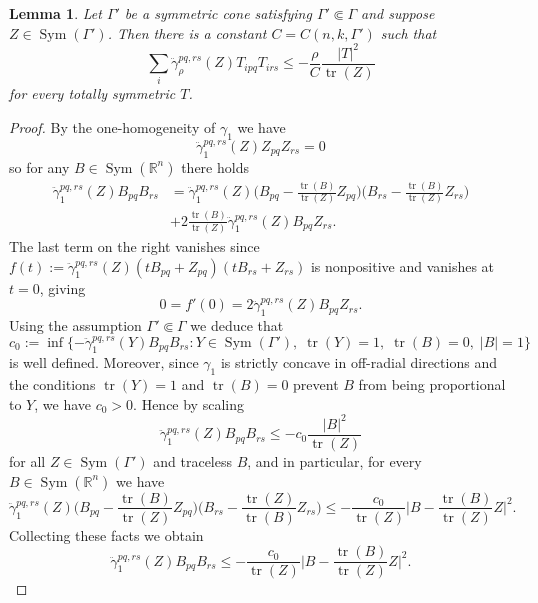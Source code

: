 \documentclass[12pt]{amsart}
\newtheorem{lemma}[theorem]{Lemma}
\DeclareMathOperator{\tr}{tr}
\DeclareMathOperator{\sym}{Sym}
\begin{document}
\begin{lemma}
\label{lem:good_grad}
Let $\Gamma'$ be a symmetric cone satisfying $\Gamma' \Subset \Gamma$ and suppose $Z \in \sym(\Gamma')$. Then there is a constant $C = C(n,k,\Gamma')$ such that 
\[\sum_i \ddot \gamma_\rho^{pq,rs}(Z) T_{ipq} T_{irs} \leq - \frac{\rho}{C} \frac{|T|^2}{\tr(Z)}\]
for every totally symmetric $T$.
\end{lemma}

\begin{proof}
By the one-homogeneity of $\gamma_1$ we have 
\[\ddot \gamma_1^{pq,rs}(Z) Z_{pq} Z_{rs} = 0\]
so for any $B \in \sym(\mathbb{R}^n)$ there holds
\begin{align*}
\ddot \gamma_1^{pq,rs}(Z) B_{pq} B_{rs} &= \ddot \gamma_1^{pq,rs}(Z) \bigg(B_{pq} - \frac{\tr(B)}{\tr(Z)}Z_{pq} \bigg)\bigg(B_{rs} - \frac{\tr(B)}{\tr(Z)}Z_{rs} \bigg)\\
& +2\frac{\tr(B)}{\tr(Z)} \ddot \gamma_1^{pq,rs}(Z) B_{pq} Z_{rs}. 
\end{align*}
The last term on the right vanishes since $f(t) := \ddot \gamma_1^{pq,rs} (Z)(tB_{pq} + Z_{pq}) (tB_{rs} + Z_{rs}) $ is nonpositive and vanishes at $t = 0$, giving
\[0 = f'(0) = 2 \ddot \gamma_1^{pq,rs}(Z) B_{pq} Z_{rs}.\]
Using the assumption $\Gamma' \Subset \Gamma$ we deduce that
\[c_0 := \inf\{ -\ddot \gamma_1^{pq,rs} (Y) B_{pq}B_{rs} : Y \in \sym(\Gamma'), \; \tr(Y) = 1, \; \tr(B) = 0, \; |B| =1\}\]
is well defined. Moreover, since $\gamma_1$ is strictly concave in off-radial directions and the conditions $\tr(Y)=1$ and $\tr(B) = 0$ prevent $B$ from being proportional to $Y$, we have $c_0 > 0$. Hence by scaling
\[\ddot \gamma_1^{pq,rs} (Z) B_{pq} B_{rs} \leq - c_0 \frac{|B|^2}{\tr(Z)}\]
for all $Z \in \sym( \Gamma')$ and traceless $B$, and in particular, for every $B \in \sym(\mathbb{R}^n)$ we have
\[\ddot \gamma_1^{pq,rs}(Z) \bigg(B_{pq} - \frac{\tr(B)}{\tr(Z)}Z_{pq} \bigg)\bigg(B_{rs} - \frac{\tr(Z)}{\tr(B)}Z_{rs} \bigg) \leq - \frac{c_0}{\tr(Z)} \bigg|B - \frac{\tr(B)}{\tr(Z)} Z\bigg|^2.\]
Collecting these facts we obtain
\begin{equation}
\label{eq:good_grad_1}
\ddot \gamma_1^{pq,rs}(Z) B_{pq} B_{rs} \leq - \frac{c_0}{\tr(Z)} \bigg|B - \frac{\tr(B)}{\tr(Z)} Z\bigg|^2.
\end{equation}


\end{proof}
\end{document}
